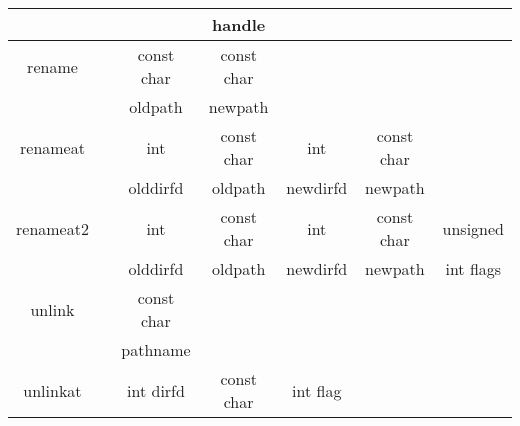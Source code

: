 \begin{table}[ht]
\begin{tabular}{ccccccc}
		&&&	\scriptsize{\fontfamily{qcr}\selectfont *handle}	&&&\\
		\hline
		\scriptsize{\fontfamily{qcr}\selectfont rename} 					& 
		\scriptsize{\fontfamily{qcr}\selectfont 82}  			&	
		\scriptsize{\fontfamily{qcr}\selectfont const char}	&	
		\scriptsize{\fontfamily{qcr}\selectfont const char}			&&&\\
		&&	\scriptsize{\fontfamily{qcr}\selectfont *oldpath}	&	
		\scriptsize{\fontfamily{qcr}\selectfont *newpath}	&&&\\
		\hline
		\scriptsize{\fontfamily{qcr}\selectfont renameat} 				& 
		\scriptsize{\fontfamily{qcr}\selectfont 264}  			&	
		\scriptsize{\fontfamily{qcr}\selectfont int} 		&	
		\scriptsize{\fontfamily{qcr}\selectfont const char} 			&	
		\scriptsize{\fontfamily{qcr}\selectfont int} 				&	
		\scriptsize{\fontfamily{qcr}\selectfont const char} 		&	 		\\
		&&	\scriptsize{\fontfamily{qcr}\selectfont olddirfd}	&	
		\scriptsize{\fontfamily{qcr}\selectfont *oldpath}			&	
		\scriptsize{\fontfamily{qcr}\selectfont newdirfd}			&	
		\scriptsize{\fontfamily{qcr}\selectfont *newpath}		& 			\\ 
		\hline
		\scriptsize{\fontfamily{qcr}\selectfont renameat2} 				& 
		\scriptsize{\fontfamily{qcr}\selectfont 316}  			&	\scriptsize{\fontfamily{qcr}\selectfont int}			&	\scriptsize{\fontfamily{qcr}\selectfont const char} 			&	\scriptsize{\fontfamily{qcr}\selectfont int} 				&	
		\scriptsize{\fontfamily{qcr}\selectfont const char} 		&	
		\scriptsize{\fontfamily{qcr}\selectfont unsigned}\\
		&&	\scriptsize{\fontfamily{qcr}\selectfont olddirfd}	&	
		\scriptsize{\fontfamily{qcr}\selectfont *oldpath}			&	
		\scriptsize{\fontfamily{qcr}\selectfont newdirfd}			&	
		\scriptsize{\fontfamily{qcr}\selectfont *newpath}		& 	
		\scriptsize{\fontfamily{qcr}\selectfont int flags}\\ 
		\hline
		\scriptsize{\fontfamily{qcr}\selectfont unlink} 					& 
		\scriptsize{\fontfamily{qcr}\selectfont 87}  			&	
		\scriptsize{\fontfamily{qcr}\selectfont const char}	&&&&\\
		&&	\scriptsize{\fontfamily{qcr}\selectfont *pathname}	&&&&\\ 
		\hline
		\scriptsize{\fontfamily{qcr}\selectfont unlinkat} 				& 
		\scriptsize{\fontfamily{qcr}\selectfont 263}  			&	
		\scriptsize{\fontfamily{qcr}\selectfont int dirfd}	&	
		\scriptsize{\fontfamily{qcr}\selectfont const char}			&	
		\scriptsize{\fontfamily{qcr}\selectfont int flag}			&					&		 	\\

\end{tabular}
\end{table}
